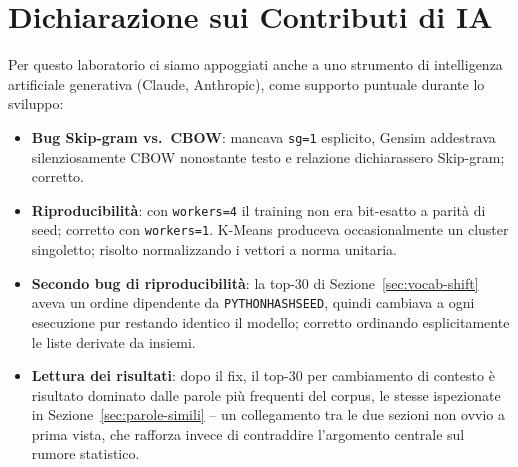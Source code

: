 \documentclass[12pt,a4paper]{article}
\begin{document}
\section{Dichiarazione sui Contributi di IA}

Per questo laboratorio ci siamo appoggiati anche a uno strumento di intelligenza artificiale generativa (Claude, Anthropic), come supporto puntuale durante lo sviluppo:

\begin{itemize}[itemsep=2pt]
  \item \textbf{Bug Skip-gram vs.\ CBOW}: mancava \texttt{sg=1} esplicito, Gensim addestrava silenziosamente CBOW nonostante testo e relazione dichiarassero Skip-gram; corretto.
  \item \textbf{Riproducibilit\`a}: con \texttt{workers=4} il training non era bit-esatto a parit\`a di seed; corretto con \texttt{workers=1}. K-Means produceva occasionalmente un cluster singoletto; risolto normalizzando i vettori a norma unitaria.
  \item \textbf{Secondo bug di riproducibilit\`a}: la top-30 di Sezione~\ref{sec:vocab-shift} aveva un ordine dipendente da \texttt{PYTHONHASHSEED}, quindi cambiava a ogni esecuzione pur restando identico il modello; corretto ordinando esplicitamente le liste derivate da insiemi.
  \item \textbf{Lettura dei risultati}: dopo il fix, il top-30 per cambiamento di contesto \`e risultato dominato dalle parole pi\`u frequenti del corpus, le stesse ispezionate in Sezione~\ref{sec:parole-simili} -- un collegamento tra le due sezioni non ovvio a prima vista, che rafforza invece di contraddire l'argomento centrale sul rumore statistico.
\end{itemize}
\end{document}
